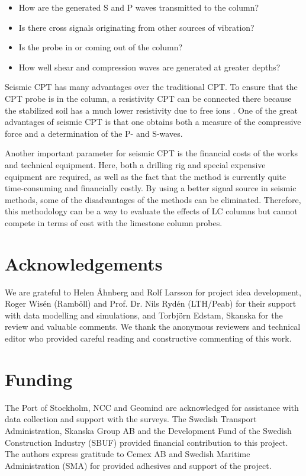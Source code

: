 \documentclass[final,3p,times,onecolumn,authoryear]{elsarticle}
\begin{document}
\begin{itemize}
\setlength\itemsep{-0.1cm}
	\item How are the generated S and P waves transmitted to the column? 
	\item Is there cross signals originating from other sources of vibration?
	\item Is the probe in or coming out of the column?
	\item How well shear and compression waves are generated at greater depths? 
\end{itemize}
    
Seismic CPT has many advantages over the traditional CPT. To ensure that the CPT probe is in the column, a resistivity CPT can be connected there because the stabilized soil has a much lower resistivity due to free ions \citep{Dahlinetal1999}. One of the great advantages of seismic CPT is that one obtains both a measure of the compressive force and a determination of the P- and S-waves. 

Another important parameter for seismic CPT is the financial costs of the works and technical equipment. Here, both a drilling rig and special expensive equipment are required, as well as the fact that the method is currently quite time-consuming and financially costly. By using a better signal source in seismic methods, some of the disadvantages of the methods can be eliminated. Therefore, this methodology can be a way to evaluate the effects of LC columns but cannot compete in terms of cost with the limestone column probes.

\section{Acknowledgements}
We are grateful to Helen Åhnberg and Rolf Larsson for project idea development, Roger Wisén (Ramböll) and Prof. Dr. Nils Rydén (LTH/Peab) for their support with data modelling and simulations, and Torbjörn Edstam, Skanska for the review and valuable comments. We thank the anonymous reviewers and technical editor who provided careful reading and constructive commenting of this work. 

\section{Funding}
The Port of Stockholm, NCC and Geomind are acknowledged for assistance with data collection and support with the surveys. The Swedish Transport Administration, Skanska Group AB and the Development Fund of the Swedish Construction Industry (SBUF) provided financial contribution to this project. The authors express gratitude to Cemex AB and Swedish Maritime Administration (SMA) for provided adhesives and support of the project.
\end{document}
